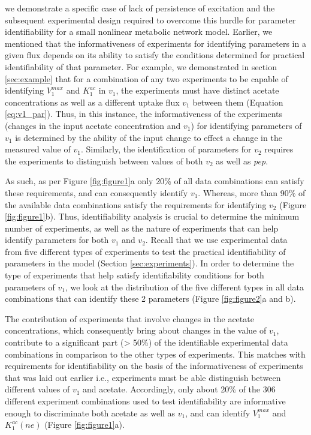 \documentclass[10pt]{article}
\begin{document}
	we demonstrate a specific case of lack of persistence of excitation and the subsequent experimental design required to overcome this hurdle for parameter identifiability for a small nonlinear metabolic network model. Earlier, we mentioned that the informativeness of experiments for identifying parameters in a given flux depends on its ability to satisfy the conditions determined for practical identifiability of that parameter. For example, we demonstrated in section \ref{sec:example} that for a combination of any two experiments to be capable of identifying $V_1^{max}$ and $K_1^{ac}$ in $v_1$, the experiments must have distinct acetate concentrations as well as a different uptake flux $v_1$ between them (Equation \ref{eq:v1_par}). Thus, in this instance, the informativeness of the experiments (changes in the input acetate concentration and $v_1$) for identifying parameters of $v_1$ is determined by the ability of the input change to effect a change in the measured value of $v_1$. Similarly, the identification of parameters for $v_2$ requires the experiments to distinguish between values of both $v_2$ as well as \textit{pep}. %
	
	As such, as per Figure \ref{fig:figure1}a only 20\% of all data combinations can satisfy these requirements, and can consequently identify $v_1$. Whereas, more than 90\% of the available data combinations satisfy the requirements for identifying $v_2$ (Figure \ref{fig:figure1}b). Thus, identifiability analysis is crucial to determine the minimum number of experiments, as well as the nature of experiments that can help identify parameters for both $v_1$ and $v_2$. Recall that we use experimental data from five different types of experiments to test the practical identifiability of parameters in the model (Section \ref{sec:experiments}).
	In order to determine the type of experiments that help satisfy identifiability conditions for both parameters of $v_1$, we look at the distribution of the five different types in all data combinations that can identify these 2 parameters (Figure \ref{fig:figure2}a and b).	
	
	The contribution of experiments that involve changes in the acetate concentrations, which consequently bring about changes in the value of $v_1$, contribute to a significant part (> 50\%) of the identifiable experimental data combinations in comparison to the other types of experiments. This matches with requirements for identifiability on the basis of the informativeness of experiments that was laid out earlier i.e., experiments must be able distinguish between different values of $v_1$ and acetate. Accordingly, only about 20\% of the 306 different experiment combinations used to test identifiability are informative enough to discriminate both acetate as well as $v_1$, and can identify $V_1^{max}$ and $K_1^{ac}(ne)$ (Figure \ref{fig:figure1}a). 	
	
\end{document}
